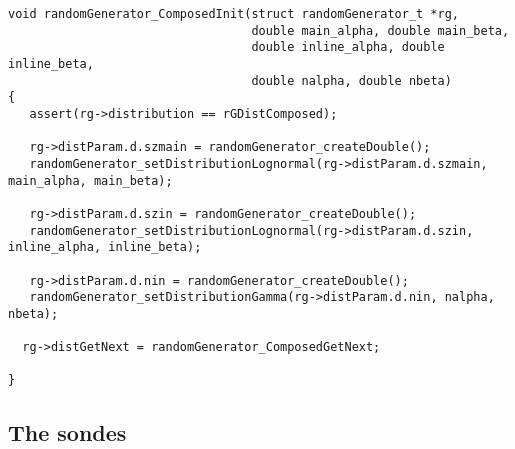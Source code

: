 \begin{verbatim}
void randomGenerator_ComposedInit(struct randomGenerator_t *rg, 
                                  double main_alpha, double main_beta,
                                  double inline_alpha, double inline_beta,
                                  double nalpha, double nbeta)
{
   assert(rg->distribution == rGDistComposed);
   
   rg->distParam.d.szmain = randomGenerator_createDouble();
   randomGenerator_setDistributionLognormal(rg->distParam.d.szmain, main_alpha, main_beta);

   rg->distParam.d.szin = randomGenerator_createDouble();
   randomGenerator_setDistributionLognormal(rg->distParam.d.szin, inline_alpha, inline_beta);

   rg->distParam.d.nin = randomGenerator_createDouble();
   randomGenerator_setDistributionGamma(rg->distParam.d.nin, nalpha, nbeta);
  
  rg->distGetNext = randomGenerator_ComposedGetNext;  
    
}
\end{verbatim}


%
\subsection{The sondes}

